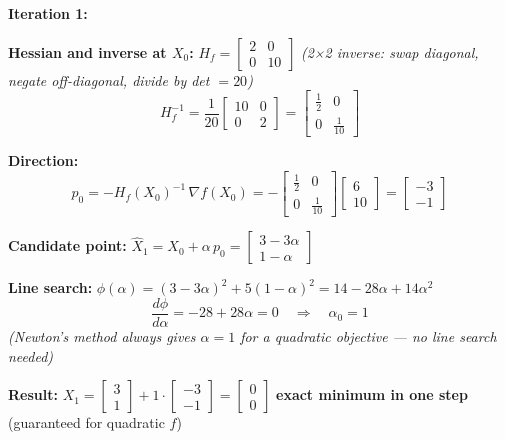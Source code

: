\documentclass[11pt,a4paper]{article}
\newenvironment{methodbox}[1]{%
  \begin{mdframed}[backgroundcolor=#1, linewidth=0.5pt,
    innertopmargin=6pt, innerbottommargin=6pt,
    innerleftmargin=10pt, innerrightmargin=10pt]
}{%
  \end{mdframed}\vspace{4pt}
}
\begin{document}
\begin{methodbox}{newtbg}
\textbf{Iteration 1:}

\medskip
\textbf{Hessian and inverse at $X_0$:}\quad
$H_f = \begin{bmatrix}2&0\\0&10\end{bmatrix}$
\quad\textit{(2×2 inverse: swap diagonal, negate off-diagonal, divide by det $= 20$)}
\[
  H_f^{-1} = \frac{1}{20}\begin{bmatrix}10&0\\0&2\end{bmatrix}
            = \begin{bmatrix}\tfrac{1}{2}&0\\0&\tfrac{1}{10}\end{bmatrix}
\]

\textbf{Direction:}
\[
  \boxed{p_0 = -H_f(X_0)^{-1}\,\nabla f(X_0)}
  = -\begin{bmatrix}\tfrac{1}{2}&0\\0&\tfrac{1}{10}\end{bmatrix}
     \begin{bmatrix}6\\10\end{bmatrix}
  = \begin{bmatrix}-3\\-1\end{bmatrix}
\]

\textbf{Candidate point:}\quad
$\hat{X}_1 = X_0 + \alpha\,p_0
           = \begin{bmatrix}3-3\alpha\\1-\alpha\end{bmatrix}$

\medskip
\textbf{Line search:}\quad
$\phi(\alpha) = (3-3\alpha)^2 + 5(1-\alpha)^2 = 14 - 28\alpha + 14\alpha^2$
\[
  \frac{d\phi}{d\alpha} = -28 + 28\alpha = 0
  \quad\Rightarrow\quad \alpha_0 = 1
\]
\textit{(Newton's method always gives $\alpha = 1$ for a quadratic objective --- no line search needed)}

\medskip
\textbf{Result:}\quad
$X_1 = \begin{bmatrix}3\\1\end{bmatrix} + 1\cdot\begin{bmatrix}-3\\-1\end{bmatrix}
      = \begin{bmatrix}0\\0\end{bmatrix}$
\quad\textbf{exact minimum in one step} (guaranteed for quadratic $f$)
\end{methodbox}
\end{document}
